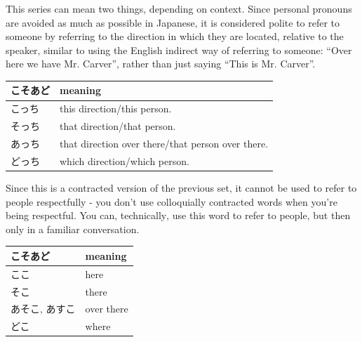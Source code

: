 \documentclass[11pt, b5paper, twoside, openright, onecolumn]{book}
\newenvironment{mytabularcentered}[1]{\noindent
\begin{center}\begin{tabular}[h]{#1}}{\end{tabular}\end{center}}
\begin{document}
This series can mean two things‚ depending on context. Since personal pronouns are avoided as much as possible in Japanese‚ it is considered polite to refer to someone by referring to the direction in which they are located‚ relative to the speaker‚ similar to using the English indirect way of referring to someone: “Over here we have Mr. Carver”‚ rather than just saying “This is Mr. Carver”.

\vspace{0.5cm}
\smaller
\begin{center}
\begin{mytabularcentered}{| l  l |}\hline 
\rule{0pt}{2.4ex}こそあど & meaning\\ 
\hline
\rule{0pt}{2.4ex}\index[japanese]{こっち}こっち & \index[english]{This!direction}this direction/\index[english]{This!person}this person.\\ 
\rule{0pt}{2.4ex}\index[japanese]{そっち}そっち & \index[english]{That!direction}that direction/\index[english]{That!person}that person.\\ 
\rule{0pt}{2.4ex}\index[japanese]{あっち}あっち & that direction over there/that person over there.\\ 
\rule{0pt}{2.4ex}\index[japanese]{どっち}どっち & \index[english]{Which!direction}which direction/\index[english]{Which!person}which person.\\ 
\hline 
\end{mytabularcentered}
\end{center}
\larger
\vspace{0.5cm}


Since this is a contracted version of the previous set‚ it cannot be used to refer to people respectfully - you don’t use colloquially contracted words when you’re being respectful. You can‚ technically‚ use this word to refer to people‚ but then only in a familiar conversation.

\vspace{0.5cm}
\smaller
\begin{center}
\begin{mytabularcentered}{| l  l |}\hline 
\rule{0pt}{2.4ex}こそあど & meaning\\ 
\hline
\rule{0pt}{2.4ex}\index[japanese]{ここ}ここ & \index[english]{Here}here\\ 
\rule{0pt}{2.4ex}\index[japanese]{そこ}そこ & \index[english]{There}there\\ 
\rule{0pt}{2.4ex}\index[japanese]{あそこ}あそこ‚ \index[japanese]{あすこ}あすこ & \index[english]{Over there}over there\\ 
\rule{0pt}{2.4ex}\index[japanese]{どこ}どこ & \index[english]{Where}where\\ 
\hline 
\end{mytabularcentered}
\end{center}
\larger
\vspace{0.5cm}
\end{document}
